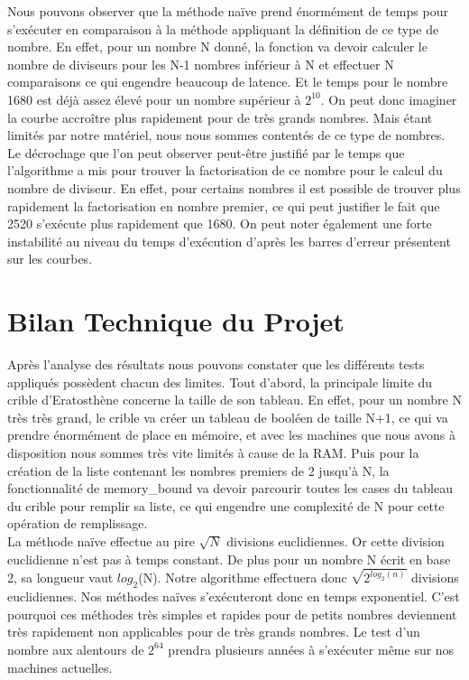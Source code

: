 Nous pouvons observer que la méthode naïve prend énormément de temps pour s'exécuter en comparaison à la méthode appliquant la définition de ce type de nombre. En effet, pour un nombre N donné, la fonction va devoir calculer le nombre de diviseurs pour les N-1 nombres inférieur à N et effectuer N comparaisons ce qui engendre beaucoup de latence. Et le temps pour le nombre 1680 est déjà assez élevé  pour un nombre supérieur à $2^{10}$. On peut donc imaginer la courbe accroître plus rapidement pour de très grands nombres. Mais étant limités par notre matériel, nous nous sommes contentés de ce type de nombres. Le décrochage que l'on peut observer peut-être justifié par le temps que l'algorithme a mis pour trouver la factorisation de ce nombre pour le calcul du nombre de diviseur. En effet, pour certains nombres il est possible de trouver plus rapidement la factorisation en nombre premier, ce qui peut justifier le fait que 2520 s'exécute plus rapidement que 1680. On peut noter également une forte instabilité au niveau du temps d'exécution d'après les barres d'erreur présentent sur les courbes.
	
	\section{Bilan Technique du Projet}	
		Après l'analyse des résultats nous pouvons constater que les différents tests appliqués possèdent chacun des limites.	
		Tout d'abord, la principale limite du crible d'Eratosthène concerne la taille de son tableau. En effet, pour un nombre N très très grand, le crible va créer un tableau de booléen de taille N+1, ce qui va prendre énormément de place en mémoire, et avec les machines que nous avons à disposition nous sommes très vite limités à cause de la RAM. Puis pour la création de la liste contenant les nombres premiers de 2 jusqu'à N, la fonctionnalité de memory\_bound va devoir parcourir toutes les cases du tableau du crible pour remplir sa liste, ce qui engendre une complexité de N pour cette opération de remplissage.\\
		
		La méthode naïve effectue au pire $\sqrt{N}$ divisions euclidiennes. Or cette division euclidienne n'est pas à temps constant. De plus pour un nombre N écrit en base 2, sa longueur vaut $log_2$(N). Notre algorithme effectuera donc $\sqrt{2^{log_2(n)}}$ divisions euclidiennes. Nos méthodes naïves s’exécuteront donc en temps exponentiel. C'est pourquoi ces méthodes très simples et rapides pour de petits nombres deviennent très rapidement non applicables pour de très grands nombres. Le test d'un nombre aux alentours de $2^{64}$ prendra plusieurs années à s’exécuter même sur nos machines actuelles.\\
		
